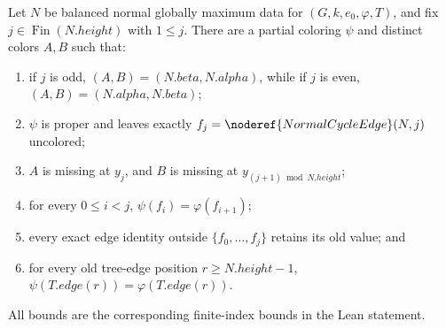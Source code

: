 \begin{helper}
Let $N$ be balanced normal globally maximum data for
$(G,k,e_0,\varphi,T)$, and fix
$j\in\operatorname{Fin}(N.height)$ with $1\leq j$.  There are a partial
coloring $\psi$ and distinct colors $A,B$ such that:
\begin{enumerate}
\item if $j$ is odd, $(A,B)=(N.beta,N.alpha)$, while if $j$ is even,
      $(A,B)=(N.alpha,N.beta)$;
\item $\psi$ is proper and leaves exactly
      $f_j=\noderef{NormalCycleEdge}(N,j)$ uncolored;
\item $A$ is missing at $y_j$, and $B$ is missing at
      $y_{(j+1)\bmod N.height}$;
\item for every $0\leq i<j$, $\psi(f_i)=\varphi(f_{i+1})$;
\item every exact edge identity outside $\{f_0,\ldots,f_j\}$ retains its
      old value; and
\item for every old tree-edge position $r\geq N.height-1$,
      $\psi(T.edge(r))=\varphi(T.edge(r))$.
\end{enumerate}
All bounds are the corresponding finite-index bounds in the Lean
statement.
\end{helper}
